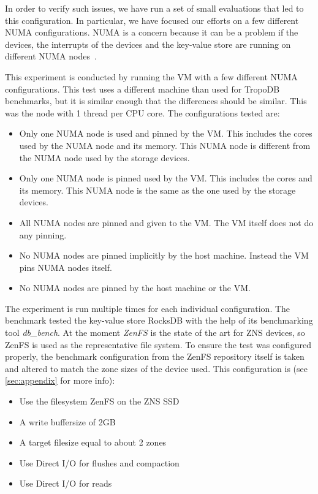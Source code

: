 In order to verify such issues, we have run a set of small evaluations that led to this configuration. In particular, we have focused our efforts on a few different NUMA configurations. NUMA is a concern because it can be a problem if the devices, the interrupts of the devices and the key-value store are running on different NUMA nodes~\cite{akram2012numa}.

This experiment is conducted by running the VM with a few different NUMA configurations. This test uses a different machine than used for TropoDB benchmarks, but it is similar enough that the differences should be similar. This was the node with 1 thread per CPU core. The configurations tested are:
\begin{itemize}
    \item Only one NUMA node is used and pinned by the VM. This includes the cores used by the NUMA node and its memory. This NUMA node is different from the NUMA node used by the storage devices. 
    \item Only one NUMA node is pinned used by the VM. This includes the cores and its memory. This NUMA node is the same as the one used by the storage devices.
    \item All NUMA nodes are pinned and given to the VM. The VM itself does not do any pinning.
    \item No NUMA nodes are pinned implicitly by the host machine. Instead the VM pins NUMA nodes itself.
    \item No NUMA nodes are pinned by the host machine or the VM.
\end{itemize}
The experiment is run multiple times for each individual configuration. The benchmark tested the key-value store RocksDB with the help of its benchmarking tool \textit{db\_bench}. At the moment \textit{ZenFS} is the state of the art for ZNS devices, so ZenFS is used as the representative file system. To ensure the test was configured properly, the benchmark configuration from the ZenFS repository itself is taken and altered to match the zone sizes of the device used. This configuration is (see \autoref{sec:appendix} for more info):
\begin{itemize}
    \item Use the filesystem ZenFS on the ZNS SSD
    \item A write buffersize of 2GB
    \item A target filesize equal to about 2 zones
    \item Use Direct I/O for flushes and compaction
    \item Use Direct I/O for reads
\end{itemize}
